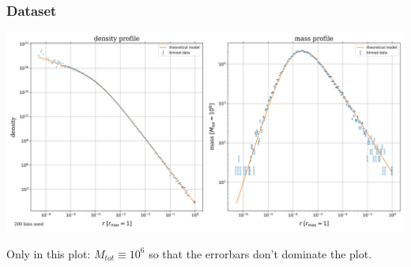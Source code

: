\begin{frame}
	\frametitle{Dataset}
	\centering
	\includegraphics[width=\linewidth]{../results/density_plot/step0_density_plot.png}
	
	\alert{Only in this plot:} $M_{tot} \equiv 10^6$ so that the errorbars don't dominate the plot.
\end{frame}



